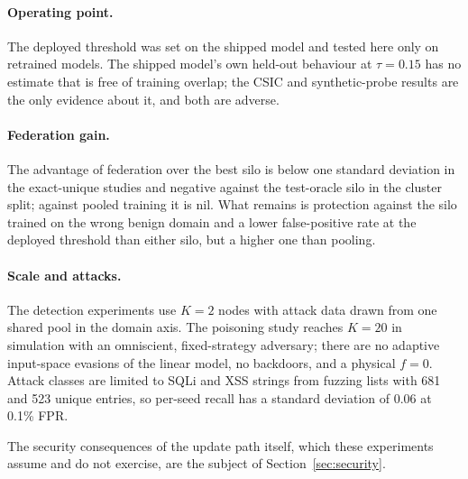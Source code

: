 \paragraph{Operating point.}
The deployed threshold was set on the shipped model and tested here only on retrained models. The shipped model's own held-out behaviour at $\tau=0.15$ has no estimate that is free of training overlap; the CSIC and synthetic-probe results are the only evidence about it, and both are adverse.

\paragraph{Federation gain.}
The advantage of federation over the best silo is below one standard deviation in the exact-unique studies and negative against the test-oracle silo in the cluster split; against pooled training it is nil. What remains is protection against the silo trained on the wrong benign domain and a lower false-positive rate at the deployed threshold than either silo, but a higher one than pooling.

\paragraph{Scale and attacks.}
The detection experiments use $K=2$ nodes with attack data drawn from one shared pool in the domain axis. The poisoning study reaches $K=20$ in simulation with an omniscient, fixed-strategy adversary; there are no adaptive input-space evasions of the linear model, no backdoors, and a physical $f=0$. Attack classes are limited to SQLi and XSS strings from fuzzing lists with 681 and 523 unique entries, so per-seed recall has a standard deviation of 0.06 at 0.1\% FPR.

The security consequences of the update path itself, which these experiments assume and do not exercise, are the subject of Section~\ref{sec:security}.
\emergencystretch=0pt
